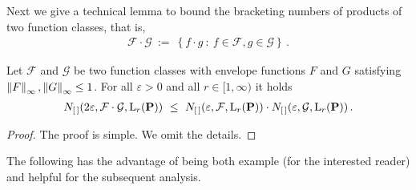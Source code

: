 Next we give a technical lemma to 
bound the bracketing numbers of products of two function classes, that is,
\begin{gather*}
  \mathcal{F}\cdot \mathcal{G}
  \ 
  :=
  \ 
  \left\{ 
    f\cdot g
    \ 
    \colon
  \ 
    f\in\mathcal{F},
    g\in\mathcal{G}
  \right\}\,.
\end{gather*}
\begin{lemma}
  \label{lem_prod_br}
  Let
  $\mathcal{F}$ and $\mathcal{G}$ be two function classes 
  with envelope functions $F$ and $G$ satisfying
  $\left\lVert F\right\rVert_\infty,\left\lVert G\right\rVert_\infty\le 1$.
  For all $\varepsilon>0$ and all $r\in [1,\infty)$ it holds
  \begin{gather*}
    N_{[\,]}(2\varepsilon,\mathcal{F}\cdot\mathcal{G},\mathrm{L}_r(\P))
    \
    \le
    \ 
    N_{[\,]}(\varepsilon,\mathcal{F},\mathrm{L}_r(\P))
    \cdot
    N_{[\,]}(\varepsilon,\mathcal{G},\mathrm{L}_r(\P))
    \,.
  \end{gather*}
\end{lemma}
\begin{proof}
  The proof is simple. We omit the details.
\end{proof}
The following has the advantage of being both example (for the interested reader) and helpful for the subsequent analysis.

